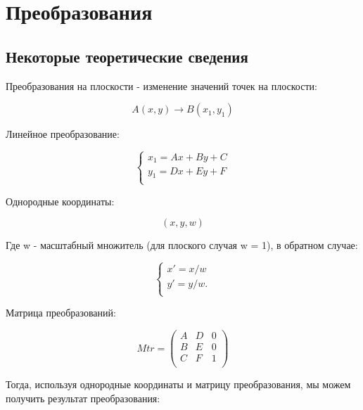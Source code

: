 \section {Преобразования}

\subsection {Некоторые теоретические сведения}

Преобразования на плоскости - изменение значений точек на плоскости:

\begin{equation}
A(x,y)\rightarrow B(x_1,y_1)
\end{equation}

Линейное преобразование:

\begin{equation}
{\begin{cases} 
	x_1 = Ax + By + C  \\
	y_1 = Dx + Ey + F  \\
	\end{cases}}
\end{equation}

Однородные координаты:

\begin{equation}
(x, y, w)
\end{equation}

Где w - масштабный множитель (для плоского случая w = 1), в обратном случае:

\begin{equation}
{\begin{cases} 
	x' = x / w  \\
	y' = y / w.  \\
	\end{cases}}
\end{equation}

Матрица преобразований:

\begin{equation}
Mtr = \left(
\begin{array}{cccc}
A & D & 0 \\
B & E & 0 \\
C & F & 1 \\
\end{array}
\right)
\end{equation}

Тогда, используя однородные координаты и матрицу преобразования, мы можем получить результат преобразования:

